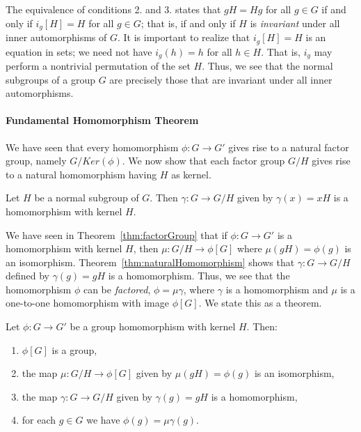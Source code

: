 The equivalence of conditions 2. and 3. states that $gH=Hg$ for all
$g\in G$ if and only if $i_g[H]=H$ for all $g\in G$; that is, if and
only if $H$ is \emph{invariant} under all inner automorphisms of $G$.
It is important to realize that $i_g[H]=H$ is an equation in sets; we
need not have $i_g(h)=h$ for all $h\in H$.  That is, $i_g$ may perform
a nontrivial permutation of the set $H$.  Thus, we see that the normal
subgroups of a group $G$ are precisely those that are invariant under
all inner automorphisms.
\paragraph{Fundamental Homomorphism Theorem}
We have seen that every homomorphism $\phi:G\to G'$ gives rise
to a natural factor group, namely $G/Ker(\phi)$.  We now show that
each factor group $G/H$ gives rise to a natural homomorphism having
$H$ as kernel.
\begin{theorem}\label{thm:naturalHomomorphism}
Let $H$ be a normal subgroup of $G$.  Then $\gamma:G\to G/H$
given by $\gamma(x)=xH$ is a homomorphism with kernel $H$.
\end{theorem}
We have seen in Theorem~\ref{thm:factorGroup} that if
$\phi:G\to G'$ is a homomorphism with kernel $H$, then
$\mu:G/H\to \phi[G]$ where $\mu(gH)=\phi(g)$ is an
isomorphism.  Theorem~\ref{thm:naturalHomomorphism} shows that
$\gamma:G\to G/H$ defined by $\gamma(g)=gH$ is a
homomorphism.  Thus, we see that the homomorphism $\phi$ can be
\emph{factored}, $\phi=\mu\gamma$, where $\gamma$ is a homomorphism
and $\mu$ is a one-to-one homomorphism with image $\phi[G]$.  We state
this as a theorem.
\begin{theorem}
Let $\phi:G\to G'$ be a group homomorphism with kernel $H$.
Then:
\begin{enumerate}
\item $\phi[G]$ is a group,
\item the map $\mu:G/H\to \phi[G]$ given by $\mu(gH) =
\phi(g)$ is an isomorphism,
\item the map $\gamma:G\to G/H$ given by $\gamma(g)=gH$ is a
homomorphism,
\item for each $g\in G$ we have $\phi(g) = \mu\gamma(g)$.
\end{enumerate}
\end{theorem}

